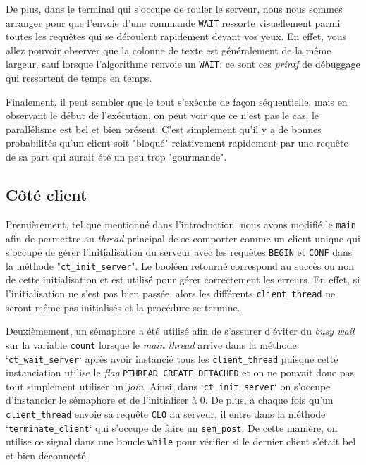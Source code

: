 \documentclass[11pt]{article}
\begin{document}
De plus, dans le terminal qui s'occupe de rouler le serveur, nous nous sommes arranger pour que l'envoie d'une commande \texttt{WAIT} ressorte visuellement parmi toutes les requêtes qui se déroulent rapidement devant vos yeux. En effet, vous allez pouvoir observer que la colonne de texte est généralement de la même largeur, sauf lorsque l'algorithme renvoie un \texttt{WAIT}: ce sont ces \textit{printf} de débuggage qui ressortent de temps en temps.

Finalement, il peut sembler que le tout s'exécute de façon séquentielle, mais en observant le début de l'exécution, on peut voir que ce n'est pas le cas: le parallélisme est bel et bien présent. C'est simplement qu'il y a de bonnes probabilités qu'un client soit "bloqué" relativement rapidement par une requête de sa part qui aurait été un peu trop "gourmande".


\subsection{Côté client}

Premièrement, tel que mentionné dans l'introduction, nous avons modifié le \texttt{main} afin de permettre au \textit{thread} principal de se comporter comme un client unique qui s'occupe de gérer l'initialisation du serveur avec les requêtes \texttt{BEGIN} et \texttt{CONF} dans la méthode "\texttt{ct\_init\_server}". Le booléen retourné correspond au succès ou non de cette initialisation et est utilisé pour gérer correctement les erreurs. En effet, si l'initialisation ne s'est pas bien passée, alors les différents \texttt{client\_thread} ne seront même pas initialisés et la procédure se termine.

Deuxièmement, un sémaphore a été utilisé afin de s'assurer d'éviter du \textit{busy wait} sur la variable \texttt{count} lorsque le \textit{main thread} arrive dans la méthode `\texttt{ct\_wait\_server}` après avoir instancié tous les \texttt{client\_thread} puisque cette instanciation utilise le \textit{flag} \texttt{PTHREAD\_CREATE\_DETACHED} et on ne pouvait donc pas tout simplement utiliser un \textit{join}. Ainsi, dans `\texttt{ct\_init\_server}` on s'occupe d'instancier le sémaphore et de l'initialiser à 0. De plus, à chaque fois qu'un \texttt{client\_thread} envoie sa requête \texttt{CLO} au serveur, il entre dans la méthode `\texttt{terminate\_client}` qui s'occupe de faire un \texttt{sem\_post}. De cette manière, on utilise ce signal dans une boucle \texttt{while} pour vérifier si le dernier client s'était bel et bien déconnecté.
\end{document}
